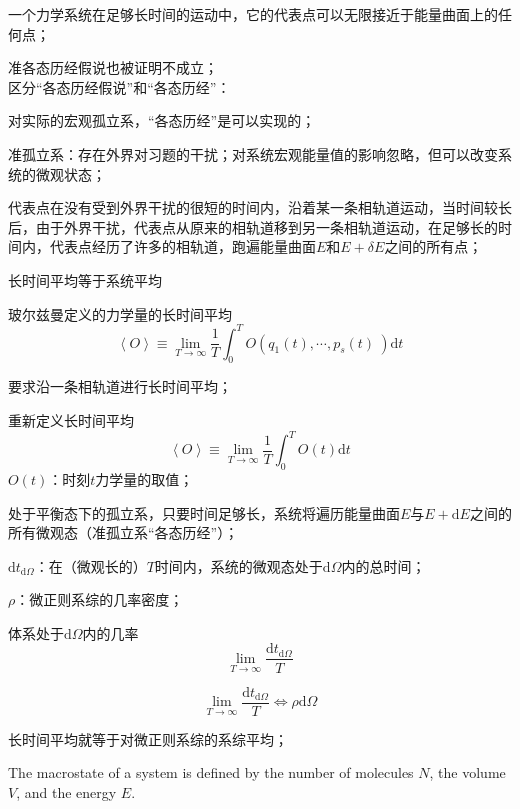 \documentclass[12pt,a4paper]{article}
\newcommand{\dif}{\mathrm{d}}
\begin{document}
一个力学系统在足够长时间的运动中，它的代表点可以无限接近于能量曲面上的任何点；

准各态历经假说也被证明不成立；\\

区分“各态历经假说”和“各态历经”：

对实际的宏观孤立系，“各态历经”是可以实现的；

准孤立系：存在外界对习题的干扰；对系统宏观能量值的影响忽略，但可以改变系统的微观状态；

代表点在没有受到外界干扰的很短的时间内，沿着某一条相轨道运动，当时间较长后，由于外界干扰，代表点从原来的相轨道移到另一条相轨道运动，在足够长的时间内，代表点经历了许多的相轨道，跑遍能量曲面$E$和$E+\delta E$之间的所有点；


长时间平均等于系统平均

玻尔兹曼定义的力学量的长时间平均
\begin{equation}
\left\langle O \right\rangle \equiv \lim_{T\rightarrow \infty} \frac{1}{T} \int_0^T O(q_1(t), \cdots, p_s(t)~ ) \dif t
\end{equation}

要求沿一条相轨道进行长时间平均；

重新定义长时间平均
\begin{equation}
\left\langle O \right\rangle \equiv \lim_{T\rightarrow \infty} \frac{1}{T} \int_0^T O(t) \dif t
\end{equation}
$O(t)$：时刻$t$力学量的取值；

处于平衡态下的孤立系，只要时间足够长，系统将遍历能量曲面$E$与$E+\dif E$之间的所有微观态（准孤立系“各态历经”）；

$\dif t_{\dif \Omega}$：在（微观长的）$T$时间内，系统的微观态处于${\dif \Omega}$内的总时间；

$\rho$：微正则系综的几率密度；

体系处于${\dif \Omega}$内的几率
\begin{equation}
\lim_{T\rightarrow \infty} \frac{\dif t_{\dif \Omega}}{T}
\end{equation}

\begin{equation}
\lim_{T\rightarrow \infty} \frac{\dif t_{\dif \Omega}}{T} \Longleftrightarrow \rho \dif \Omega
\end{equation}

长时间平均就等于对微正则系综的系综平均；


The macrostate of a system is defined by the number of molecules $N$, the volume $V$, and the energy $E$. 
\end{document}
